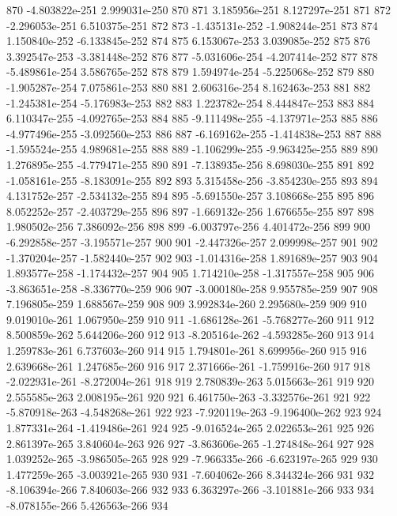 \documentclass{article}
\begin{document}
\begin{Schunk}
\begin{Soutput}
870  -4.803822e-251  2.999031e-250  870
871   3.185956e-251  8.127297e-251  871
872  -2.296053e-251  6.510375e-251  872
873  -1.435131e-252 -1.908244e-251  873
874   1.150840e-252 -6.133845e-252  874
875   6.153067e-253  3.039085e-252  875
876   3.392547e-253 -3.381448e-252  876
877  -5.031606e-254 -4.207414e-252  877
878  -5.489861e-254  3.586765e-252  878
879   1.594974e-254 -5.225068e-252  879
880  -1.905287e-254  7.075861e-253  880
881   2.606316e-254  8.162463e-253  881
882  -1.245381e-254 -5.176983e-253  882
883   1.223782e-254  8.444847e-253  883
884   6.110347e-255 -4.092765e-253  884
885  -9.111498e-255 -4.137971e-253  885
886  -4.977496e-255 -3.092560e-253  886
887  -6.169162e-255 -1.414838e-253  887
888  -1.595524e-255  4.989681e-255  888
889  -1.106299e-255 -9.963425e-255  889
890   1.276895e-255 -4.779471e-255  890
891  -7.138935e-256  8.698030e-255  891
892  -1.058161e-255 -8.183091e-255  892
893   5.315458e-256 -3.854230e-255  893
894   4.131752e-257 -2.534132e-255  894
895  -5.691550e-257  3.108668e-255  895
896   8.052252e-257 -2.403729e-255  896
897  -1.669132e-256  1.676655e-255  897
898   1.980502e-256  7.386092e-256  898
899  -6.003797e-256  4.401472e-256  899
900  -6.292858e-257 -3.195571e-257  900
901  -2.447326e-257  2.099998e-257  901
902  -1.370204e-257 -1.582440e-257  902
903  -1.014316e-258  1.891689e-257  903
904   1.893577e-258 -1.174432e-257  904
905   1.714210e-258 -1.317557e-258  905
906  -3.863651e-258 -8.336770e-259  906
907  -3.000180e-258  9.955785e-259  907
908   7.196805e-259  1.688567e-259  908
909   3.992834e-260  2.295680e-259  909
910   9.019010e-261  1.067950e-259  910
911  -1.686128e-261 -5.768277e-260  911
912   8.500859e-262  5.644206e-260  912
913  -8.205164e-262 -4.593285e-260  913
914   1.259783e-261  6.737603e-260  914
915   1.794801e-261  8.699956e-260  915
916   2.639668e-261  1.247685e-260  916
917   2.371666e-261 -1.759916e-260  917
918  -2.022931e-261 -8.272004e-261  918
919   2.780839e-263  5.015663e-261  919
920   2.555585e-263  2.008195e-261  920
921   6.461750e-263 -3.332576e-261  921
922  -5.870918e-263 -4.548268e-261  922
923  -7.920119e-263 -9.196400e-262  923
924   1.877331e-264 -1.419486e-261  924
925  -9.016524e-265  2.022653e-261  925
926   2.861397e-265  3.840604e-263  926
927  -3.863606e-265 -1.274848e-264  927
928   1.039252e-265 -3.986505e-265  928
929  -7.966335e-266 -6.623197e-265  929
930   1.477259e-265 -3.003921e-265  930
931  -7.604062e-266  8.344324e-266  931
932  -8.106394e-266  7.840603e-266  932
933   6.363297e-266 -3.101881e-266  933
934  -8.078155e-266  5.426563e-266  934

\end{Soutput}
\end{Schunk}
\end{document}
